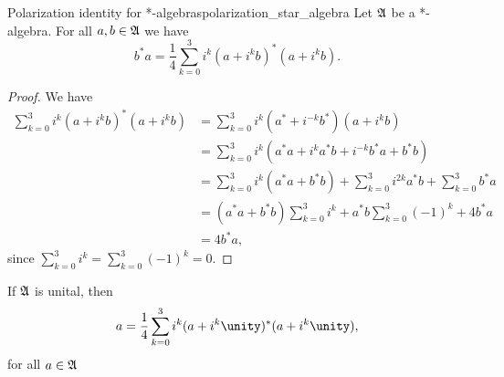 \begin{proposition}{Polarization identity for *-algebras}{polarization_star_algebra}
    Let \(\mathfrak{A}\) be a *-algebra. For all \(a, b \in \mathfrak{A}\) we have
    \begin{equation*}
        b^*a = \frac14 \sum_{k=0}^3 i^k(a + i^kb)^*(a + i^kb).
    \end{equation*}
\end{proposition}
\begin{proof}
    We have
    \begin{align*}
        \sum_{k=0}^3 i^k(a + i^kb)^*(a + i^kb) &= \sum_{k=0}^3 i^k(a^* + i^{-k}b^*)(a + i^kb)\\
                                               &= \sum_{k=0}^3 i^k(a^*a + i^ka^*b + i^{-k}b^*a + b^*b)\\
                                               &= \sum_{k=0}^3 i^k(a^*a + b^*b) + \sum_{k=0}^3 i^{2k} a^*b + \sum_{k = 0}^3 b^*a\\
                                               &= (a^*a + b^*b)\sum_{k=0}^3 i^k + a^*b\sum_{k=0}^3 (-1)^{k}  + 4b^*a\\
                                               &= 4 b^*a,
    \end{align*}
    since \(\sum_{k=0}^3 i^k = \sum_{k=0}^3 (-1)^k = 0\).
\end{proof}
\begin{remark}
    If \(\mathfrak{A}\) is unital, then
    \begin{equation*}
        a = \frac14 \sum_{k=0}^3 i^k(a + i^k\unity)^*(a + i^k\unity),
    \end{equation*}
    for all \(a \in \mathfrak{A}\)
\end{remark}

